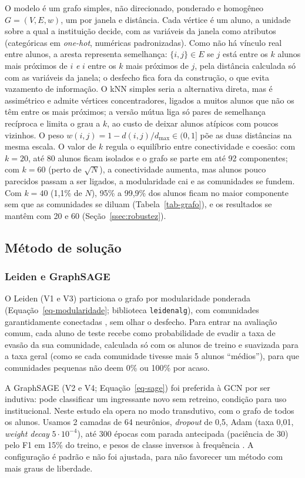 O modelo é um grafo simples, não direcionado, ponderado e homogêneo $G = (V, E, w)$, um por janela e distância. Cada vértice é um aluno, a unidade sobre a qual a instituição decide, com as variáveis da janela como atributos (categóricas em \textit{one-hot}, numéricas padronizadas). Como não há vínculo real entre alunos, a aresta representa semelhança: $\{i, j\} \in E$ se $j$ está entre os $k$ alunos mais próximos de $i$ \textit{e} $i$ entre os $k$ mais próximos de $j$, pela distância calculada só com as variáveis da janela; o desfecho fica fora da construção, o que evita vazamento de informação. O kNN simples seria a alternativa direta, mas é assimétrico e admite vértices concentradores, ligados a muitos alunos que não os têm entre os mais próximos; a versão mútua liga só pares de semelhança recíproca e limita o grau a $k$, ao custo de deixar alunos atípicos com poucos vizinhos. O peso $w(i,j) = 1 - d(i,j)/d_{\max} \in (0, 1]$ põe as duas distâncias na mesma escala. O valor de $k$ regula o equilíbrio entre conectividade e coesão: com $k = 20$, até 80 alunos ficam isolados e o grafo se parte em até 92 componentes; com $k = 60$ (perto de $\sqrt{N}$), a conectividade aumenta, mas alunos pouco parecidos passam a ser ligados, a modularidade cai e as comunidades se fundem. Com $k = 40$ (1,1\% de $N$), 95\% a 99,9\% dos alunos ficam no maior componente sem que as comunidades se diluam (Tabela~\ref{tab-grafo}), e os resultados se mantêm com 20 e 60 (Seção~\ref{ssec:robustez}).

\subsection{Método de solução}

\subsubsection{Leiden e GraphSAGE}

O Leiden (V1 e V3) particiona o grafo por modularidade ponderada (Equação~\ref{eq-modularidade}; biblioteca \texttt{leidenalg}), com comunidades garantidamente conectadas \citep{traag2019}, sem olhar o desfecho. Para entrar na avaliação comum, cada aluno de teste recebe como probabilidade de evadir a taxa de evasão da sua comunidade, calculada só com os alunos de treino e suavizada para a taxa geral (como se cada comunidade tivesse mais 5 alunos ``médios''), para que comunidades pequenas não deem 0\% ou 100\% por acaso.

A GraphSAGE (V2 e V4; Equação~\ref{eq-sage}) foi preferida à GCN por ser indutiva: pode classificar um ingressante novo sem retreino, condição para uso institucional. Neste estudo ela opera no modo transdutivo, com o grafo de todos os alunos. Usamos 2 camadas de 64 neurônios, \textit{dropout} de 0,5, Adam (taxa 0,01, \textit{weight decay} $5\cdot10^{-4}$), até 300 épocas com parada antecipada (paciência de 30) pelo F1 em 15\% do treino, e pesos de classe inversos à frequência \citep{fey2019}. A configuração é padrão e não foi ajustada, para não favorecer um método com mais graus de liberdade.

